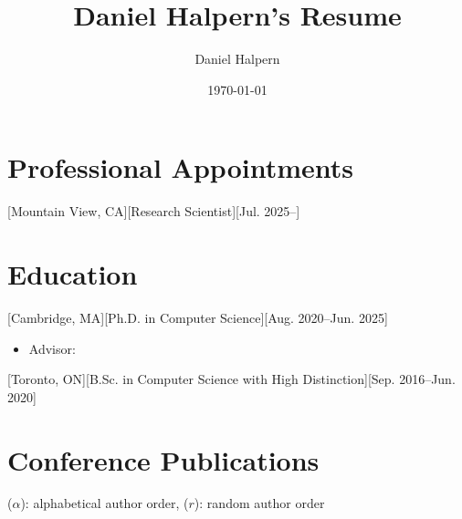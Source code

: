 \documentclass{article}
\title{Daniel Halpern's Resume}
\author{Daniel Halpern}
\date{\today}
\newcommand{\link}[2]{\iftoggle{uselinks}{\href{#1}{#2}}{#2}\xspace}
\begin{document}

    \makecvtitle %

    \section{Professional Appointments}

    [Mountain View, CA][Research Scientist][Jul. 2025--]


    \section{Education}

    [Cambridge, MA][Ph.D. in Computer Science][Aug. 2020--Jun. 2025]
\begin{itemize}
    \item Advisor: \link{http://procaccia.info}{Ariel D. Procaccia}
\end{itemize}

    [Toronto, ON][B.Sc. in Computer Science with High Distinction][Sep. 2016--Jun. 2020]

    
    
	

    \section{Conference Publications}
    {\footnotesize($\alpha$): alphabetical author order, ($r$): random author order}
    
    \begin{etaremune}
    	[itemsep=0.2ex,
    	leftmargin=4.8ex]
    	\renewcommand{\labelenumi}{C\theenumi.}
        
    \end{etaremune}
\end{document}
